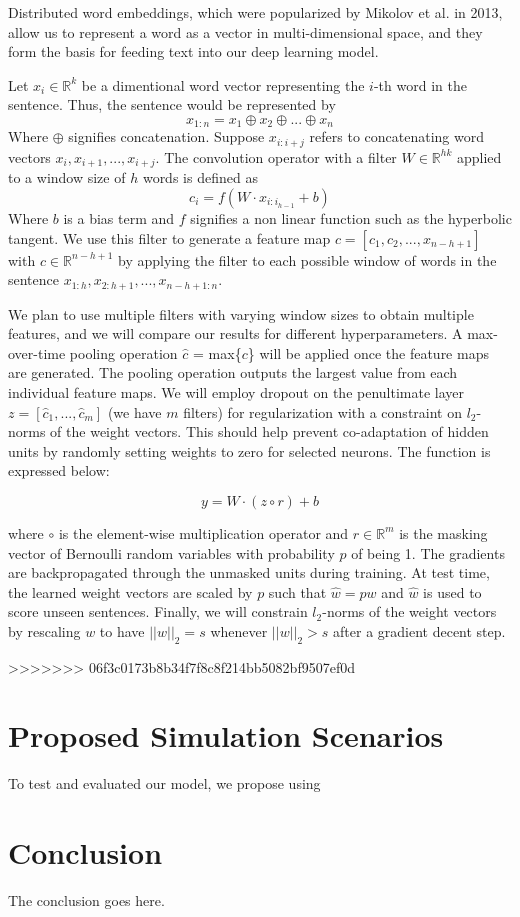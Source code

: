 \documentclass[conference]{IEEEtran}
\begin{document}
     Distributed word embeddings, which were popularized by Mikolov et al.
     in 2013\cite{word2vec}, allow us to represent a word as a vector in
     multi-dimensional space, and they form the basis for feeding text into our deep
     learning model.
	
     Let $x_{i} \in \mathbb{R}^k$ be a dimentional word vector representing the $i$-th word in the 
     sentence. Thus, the sentence would be represented by 
     \begin{equation}
      x_{1:n} = x_1 \oplus x_2 \oplus ... \oplus x_n
      \end{equation}
      Where $\oplus$ signifies concatenation. Suppose $x_{i:i+j}$ refers to concatenating 
      word vectors $x_i, x_{i+1}, ... , x_{i+j}$. The convolution operator with a filter
       $W \in \mathbb{R}^{hk}$ applied to a window size of $h$ 
      words is defined as 
      \begin{equation}
      c_i = f(W \cdot x_{i:i_{h-1}} + b)
      \end{equation}
      Where $b$ is a bias term and $f$ signifies a non linear function such as the hyperbolic
      tangent. We use this filter to generate a feature map $c = [c_1, c_2, ... ,x_{n-h+1}]$ 
      with $c \in \mathbb{R}^{n-h+1}$ by applying the filter to each possible window of words in
      the sentence $x_{1:h}, x_{2:h+1}, ... ,x_{n-h+1:n}$. 
 
      We plan to use multiple filters with varying window sizes to obtain multiple features, and we will      
      compare our results for different hyperparameters. 
      A max-over-time pooling operation $\hat{c}$ = max\{$c$\} will be applied once the feature 
      maps are generated. The pooling operation outputs the largest value from each individual
      feature maps. We will employ dropout on the penultimate layer $z = [\hat{c}_1,...,\hat{c}_m]$ 
      (we have $m$ filters) for regularization with a constraint on $l_2$-norms of the weight
      vectors. This should help prevent co-adaptation of hidden units by randomly setting weights 
      to zero for selected neurons. The function is expressed below: 
 
      \begin{equation}
       y = W \cdot (z \circ r) + b
      \end{equation}
      
      where $\circ$ is the element-wise multiplication operator and $r \in \mathbb{R}^m$ is 
      the masking vector of Bernoulli random variables with probability $p$ of being 1. 
      The gradients are backpropagated through the unmasked units during training. At test 
      time, the learned weight vectors are scaled by $p$ such that $\hat{w} = pw$ and $\hat{w}$ 
      is used to score unseen sentences. Finally, we will constrain $l_2$-norms of the weight 
      vectors by rescaling $w$ to have $||w||_2 = s$ whenever $||w||_2 > s$ after a gradient
      decent step.
 
>>>>>>> 06f3c0173b8b34f7f8c8f214bb5082bf9507ef0d
\section{Proposed Simulation Scenarios}
      To test and evaluated our model, we propose using
\section{Conclusion}
The conclusion goes here.



\end{document}
